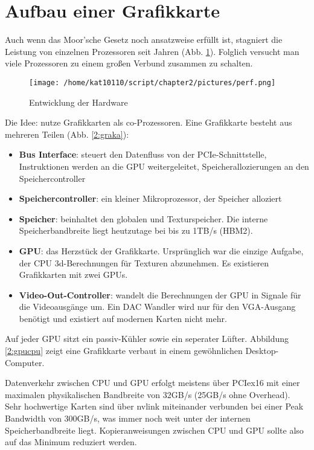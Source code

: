         \section{Aufbau einer Grafikkarte}
        Auch wenn das Moor'sche Gesetz noch ansatzweise erfüllt ist, stagniert die Leistung von einzelnen Prozessoren seit Jahren (Abb. \ref{2:hard}). Folglich versucht man viele Prozessoren zu einem großen Verbund zusammen zu schalten.
        
        \begin{figure}[h]
			\centering
    		\texttt{[image: /home/kat10110/script/chapter2/pictures/perf.png]}
    		\caption[Hardware]{Entwicklung der Hardware}
    		\label{2:hard}
		\end{figure}

		Die Idee: nutze Grafikkarten als co-Prozessoren. Eine Grafikkarte besteht aus mehreren Teilen (Abb. \ref{2:graka}):
		\begin{itemize}
			\item \textbf{Bus Interface}: steuert den Datenfluss von der \Gls{PCIe}-Schnittstelle, Instruktionen werden an die GPU weitergeleitet, Speicherallozierungen an den Speichercontroller
			\item \textbf{Speichercontroller}: ein kleiner Mikroprozessor, der Speicher alloziert
			\item \textbf{Speicher}: beinhaltet den globalen und Texturspeicher. Die interne Speicherbandbreite liegt heutzutage bei bis zu 1TB/s (HBM2).
			\item \textbf{GPU}: das Herzstück der Grafikkarte. Ursprünglich war die einzige Aufgabe, der CPU 3d-Berechnungen für Texturen abzunehmen. Es existieren Grafikkarten mit zwei GPUs.
			\item \textbf{Video-Out-Controller}: wandelt die Berechnungen der GPU in Signale für die Videoausgänge um. Ein DAC Wandler wird nur für den VGA-Ausgang benötigt und existiert auf modernen Karten nicht mehr. 			
		\end{itemize}
		Auf jeder GPU sitzt ein passiv-Kühler sowie ein seperater Lüfter. Abbildung \ref{2:gpucpu} zeigt eine Grafikkarte verbaut in einem gewöhnlichen Desktop-Computer. 
		
		Datenverkehr zwischen CPU und GPU erfolgt meistens über \Gls{PCIe}x16 mit einer maximalen physikalischen Bandbreite von 32GB/s (25GB/s ohne Overhead). Sehr hochwertige Karten sind über \gls{nvlink} miteinander verbunden bei einer \Gls{Peak Bandwidth} von 300GB/s, was immer noch weit unter der internen Speicherbandbreite liegt. Kopieranweisungen zwischen CPU und GPU sollte also auf das Minimum reduziert werden.
		
